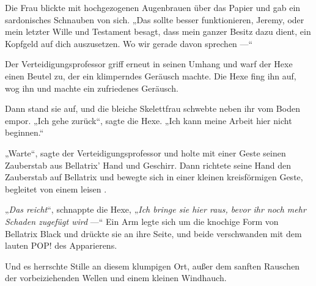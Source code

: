 Die Frau blickte mit hochgezogenen Augenbrauen über das Papier und gab ein sardonisches Schnauben von sich.
„Das sollte besser funktionieren, Jeremy, oder mein letzter Wille und Testament besagt, dass mein ganzer Besitz dazu dient, ein Kopfgeld auf dich auszusetzen. Wo wir gerade davon sprechen —“

Der Verteidigungsprofessor griff erneut in seinen Umhang und warf der Hexe einen Beutel zu, der ein klimperndes Geräusch machte. Die Hexe fing ihn auf, wog ihn und machte ein zufriedenes Geräusch.

Dann stand sie auf, und die bleiche Skelettfrau schwebte neben ihr vom Boden empor.
„Ich gehe zurück“, sagte die Hexe.
„Ich kann meine Arbeit hier nicht beginnen.“

„Warte“, sagte der Verteidigungsprofessor und holte mit einer Geste seinen Zauberstab aus Bellatrix’ Hand und Geschirr. Dann richtete seine Hand den Zauberstab auf Bellatrix und bewegte sich in einer kleinen kreisförmigen Geste, begleitet von einem leisen .

„\emph{Das reicht}“, schnappte die Hexe,
„\emph{Ich bringe sie hier raus, bevor ihr noch mehr Schaden zugefügt wird} —“ Ein Arm legte sich um die knochige Form von Bellatrix Black und drückte sie an ihre Seite, und beide verschwanden mit dem lauten POP! des Apparierens.

Und es herrschte Stille an diesem klumpigen Ort, außer dem sanften Rauschen der vorbeiziehenden Wellen und einem kleinen Windhauch.

